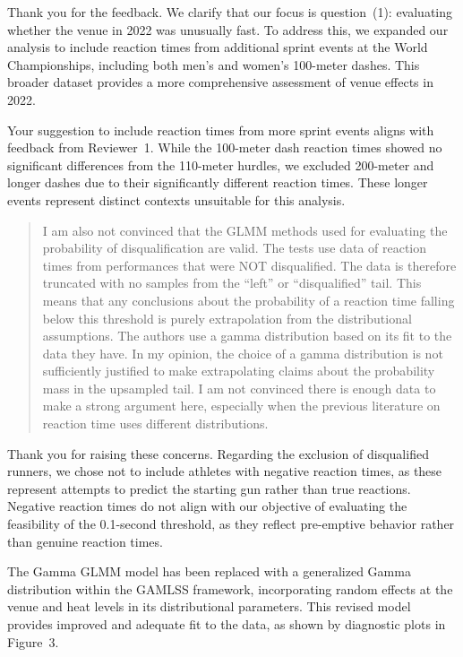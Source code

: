 \documentclass[12pt]{article}
\newenvironment{comment}%
{\begin{quotation}\noindent\small\it\color{darkblue}\ignorespaces%
}{\end{quotation}}
\begin{document}
Thank you for the feedback. We clarify that our focus is question~(1): 
evaluating whether the venue in 2022 was unusually fast. To address this, 
we expanded our analysis to include reaction times from additional sprint 
events at the World Championships, including both men’s and women’s 
100-meter dashes. This broader dataset provides a more comprehensive 
assessment of venue effects in 2022.


Your suggestion to include reaction times from more sprint events aligns 
with feedback from Reviewer~1.  While the 100-meter dash reaction times 
showed no significant differences from the 110-meter hurdles, we excluded 
200-meter and longer dashes due to their significantly different reaction 
times. These longer events represent distinct contexts unsuitable for this 
analysis.


\begin{comment}
I am also not convinced that the GLMM methods used for evaluating the
probability of disqualification are valid. The tests use data of reaction times
from performances that were NOT disqualified.  The data is therefore truncated
with no samples from the “left” or “disqualified” tail. This means that any
conclusions about the probability of a reaction time falling below this
threshold is purely extrapolation from the distributional assumptions. The
authors use a gamma distribution based on its fit to the data they have. In my
opinion, the choice of a gamma distribution is not sufficiently justified to
make extrapolating claims about the probability mass in the upsampled tail. I am
not convinced there is enough data to make a strong argument here, especially
when the previous literature on reaction time uses different distributions.
\end{comment}



Thank you for raising these concerns. Regarding the exclusion of 
disqualified runners, we chose not to include athletes with negative 
reaction times, as these represent attempts to predict the starting gun 
rather than true reactions. Negative reaction times do not align with 
our objective of evaluating the feasibility of the 0.1-second threshold, 
as they reflect pre-emptive behavior rather than genuine reaction
times.


The Gamma GLMM model has been replaced with a generalized Gamma 
distribution within the GAMLSS framework, incorporating random effects 
at the venue and heat levels in its distributional parameters. This 
revised model provides improved and adequate fit to the data, as shown 
by diagnostic plots in Figure~3.
\end{document}
